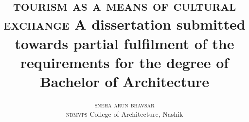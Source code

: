 \documentclass[a5paper]{book}
\title{
  \Large{\textsc{tourism as a means of cultural exchange}}
  \newline
  \newline
  \small{
  A dissertation submitted towards partial fulfilment of the\\
  requirements for the degree of Bachelor of Architecture
  }
}
\author{
  \textsc{sneha arun bhavsar}\\
  \small{
    \textsc{ndmvps} College of Architecture, Nashik
    }
  }
\date{
  \vfill
  \small{
  \centerline{\texttt{[image: img/puni]}}
  University of Pune\\
  1997--8
  \\
  }
}
\begin{document}
  \maketitle

  \pagebreak

  

  \pagebreak

  \tableofcontents
  \listoffigures
  \listoftables

  \vfill
  
  \pagebreak

    
  
  
  
  
  
  
\end{document}
